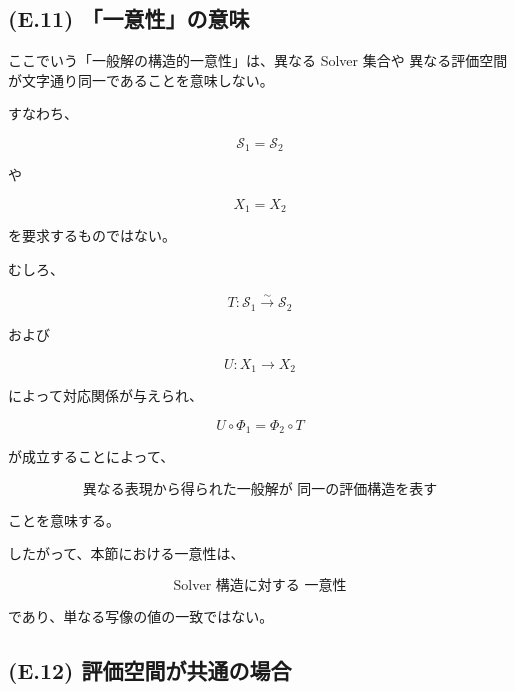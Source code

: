 \documentclass[a4paper,11pt]{article}
\newcommand{\Solver}{\mathcal{S}}
\begin{document}
\subsection{(E.11) 「一意性」の意味}
\label{subsec:E11}

ここでいう「一般解の構造的一意性」は、異なる Solver 集合や
異なる評価空間が文字通り同一であることを意味しない。

すなわち、

\begin{equation}
    \Solver_1=\Solver_2
\end{equation}

や

\begin{equation}
    X_1=X_2
\end{equation}

を要求するものではない。

むしろ、

\begin{equation}
    T:
    \Solver_1
    \overset{\sim}{\longrightarrow}
    \Solver_2
\end{equation}

および

\begin{equation}
    U:
    X_1\to X_2
\end{equation}

によって対応関係が与えられ、

\begin{equation}
    U\circ\Phi_1
    =
    \Phi_2\circ T
\end{equation}

が成立することによって、

\begin{equation}
    \boxed{
        \text{異なる表現から得られた一般解が
        同一の評価構造を表す}
    }
\end{equation}

ことを意味する。

したがって、本節における一意性は、

\begin{equation}
    \boxed{
        \text{Solver 構造に対する
        一意性}
    }
\end{equation}

であり、単なる写像の値の一致ではない。


\subsection{(E.12) 評価空間が共通の場合}
\label{subsec:E12}
\end{document}
